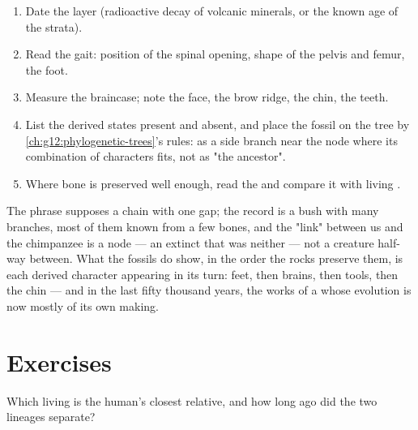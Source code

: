 \begin{method}\label{met:g12:human-evolution:placing}
\begin{enumerate}
  \item Date the layer (radioactive decay of volcanic minerals, or the
        known age of the strata).
  \item Read the gait: position of the spinal opening, shape of the
        pelvis and femur, the foot.
  \item Measure the braincase; note the face, the brow ridge, the
        chin, the teeth.
  \item List the derived states present and absent, and place the
        fossil on the tree by \cref{ch:g12:phylogenetic-trees}'s rules:
        as a side branch near the node where its combination of
        characters fits, not as "the ancestor".
  \item Where bone is preserved well enough, read the  and compare
        it with living .
\end{enumerate}
\end{method}

\begin{remark}\label{rem:g12:human-evolution:link}
The phrase supposes a chain with one gap; the record is a bush with
many branches, most of them known from a few bones, and the "link"
between us and the chimpanzee is a node --- an extinct  that
was neither --- not a creature half-way between. What the fossils do
show, in the order the rocks preserve them, is each derived character
appearing in its turn: feet, then brains, then tools, then the
chin --- and in the last fifty thousand years, the works of a 
whose evolution is now mostly of its own making.
\end{remark}

\section{Exercises}

\begin{exercise}[$\star$]\label{exo:g12:human-evolution:1}
Which living  is the human's closest relative, and how long ago
did the two lineages separate?
\end{exercise}

